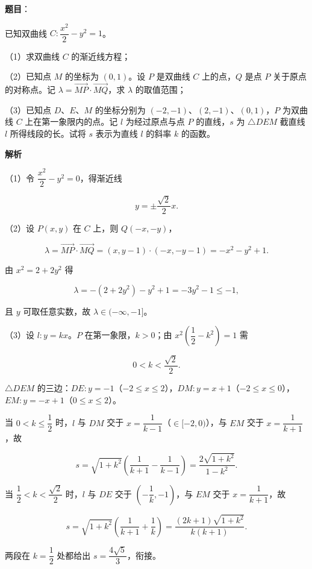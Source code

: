 \begin{answer}

\textbf{题目}：

已知双曲线 $C:\dfrac{x^2}2-y^2=1$。

（1）求双曲线 $C$ 的渐近线方程；

（2）已知点 $M$ 的坐标为 $(0,1)$。设 $P$ 是双曲线 $C$ 上的点，$Q$ 是点 $P$ 关于原点的对称点。记 $\lambda=\overrightarrow{MP}\cdot\overrightarrow{MQ}$，求 $\lambda$ 的取值范围；

（3）已知点 $D$、$E$、$M$ 的坐标分别为 $(-2,-1)$、$(2,-1)$、$(0,1)$，$P$ 为双曲线 $C$ 上在第一象限内的点。记 $l$ 为经过原点与点 $P$ 的直线，$s$ 为 $\triangle DEM$ 截直线 $l$ 所得线段的长。试将 $s$ 表示为直线 $l$ 的斜率 $k$ 的函数。

\textbf{解析}

（1）令 $\dfrac{x^2}2-y^2=0$，得渐近线

\nopagebreak[4]
\[y=\pm\frac{\sqrt2}2x.\]

（2）设 $P(x,y)$ 在 $C$ 上，则 $Q(-x,-y)$，

\nopagebreak[4]
\[\lambda=\overrightarrow{MP}\cdot\overrightarrow{MQ}=(x,y-1)\cdot(-x,-y-1)=-x^2-y^2+1.\]

由 $x^2=2+2y^2$ 得

\nopagebreak[4]
\[\lambda=-(2+2y^2)-y^2+1=-3y^2-1\leqslant-1,\]

且 $y$ 可取任意实数，故 $\lambda\in(-\infty,-1]$。

（3）设 $l:y=kx$。$P$ 在第一象限，$k>0$；由 $x^2\left(\dfrac12-k^2\right)=1$ 需

\nopagebreak[4]
\[0<k<\frac{\sqrt2}2.\]

$\triangle DEM$ 的三边：$DE:y=-1$（$-2\leqslant x\leqslant2$），$DM:y=x+1$（$-2\leqslant x\leqslant0$），$EM:y=-x+1$（$0\leqslant x\leqslant2$）。

当 $0<k\leqslant\dfrac12$ 时，$l$ 与 $DM$ 交于 $x=\dfrac1{k-1}$（$\in[-2,0)$），与 $EM$ 交于 $x=\dfrac1{k+1}$，故

\nopagebreak[4]
\[s=\sqrt{1+k^2}\left(\frac1{k+1}-\frac1{k-1}\right)=\frac{2\sqrt{1+k^2}}{1-k^2}.\]

当 $\dfrac12<k<\dfrac{\sqrt2}2$ 时，$l$ 与 $DE$ 交于 $\left(-\dfrac1k,-1\right)$，与 $EM$ 交于 $x=\dfrac1{k+1}$，故

\nopagebreak[4]
\[s=\sqrt{1+k^2}\left(\frac1{k+1}+\frac1k\right)=\frac{(2k+1)\sqrt{1+k^2}}{k(k+1)}.\]

两段在 $k=\dfrac12$ 处都给出 $s=\dfrac{4\sqrt5}3$，衔接。

\gkanswer{答案：（1）$y=\pm\dfrac{\sqrt2}2x$；（2）$(-\infty,-1]$；（3）分段函数见解析。}

\end{answer}
